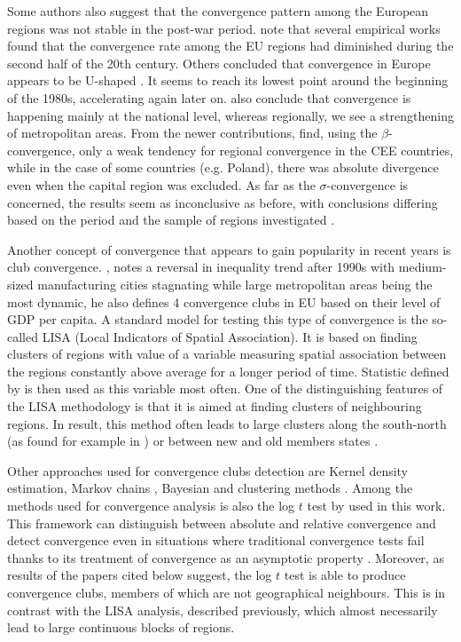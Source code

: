 \documentclass[11pt]{article}
\begin{document}
 Some authors also suggest that the convergence pattern among the European regions was not stable in the post-war period. \citet{eckey2007convergence} note that several empirical works found that the convergence rate among the EU regions had diminished during the second half of the 20th century. Others concluded that convergence in Europe appears to be U-shaped \citep{basile2001regional, geppert2008regional}. It seems to reach its lowest point around the beginning of the 1980s, accelerating again later on. \citet{geppert2008regional} also conclude that convergence is happening mainly at the national level, whereas regionally, we see a strengthening of metropolitan areas. From the newer contributions, \citet*{sme2012regional} find, using the $\beta$-convergence, only a weak tendency for regional convergence in the CEE countries, while in the case of some countries (e.g. Poland), there was absolute divergence even when the capital region was excluded. As far as the $\sigma$-convergence is concerned, the results seem as inconclusive as before, with conclusions differing based on the period and the sample of regions investigated \citep{eckey2007convergence}.
 
 Another concept of convergence that appears to gain popularity in recent years is club convergence. \citet{iammarino2017regional}, notes a reversal in inequality trend after 1990s with medium-sized manufacturing cities stagnating while large metropolitan areas being the most dynamic, he also defines 4 convergence clubs in EU based on their level of GDP per capita.  %
 A standard model for testing this type of convergence is the so-called LISA (Local Indicators of Spatial Association). It is based on finding clusters of regions with value of a variable measuring spatial association between the regions constantly above  average for a longer period of time. Statistic defined by \citet{getis1992analysis} is then used as this variable most often. One of the distinguishing features of the LISA methodology is that it is aimed at finding clusters of neighbouring regions. In result, this method often leads to large clusters along the south-north  (as found for example in \citet{baumont2003spatial}) or between new and old members states \citep{eckey2007convergence}.
 
Other approaches used for convergence clubs detection are Kernel density estimation, Markov chains \citep{eckey2007convergence}, Bayesian \citep{fischer2015bayesian} and clustering methods \citep{maasoumi2008economic}. 
Among the methods used for convergence analysis is also the log $t$ test by \citet{phillips2007transition} used in this work. This framework can distinguish between absolute and relative convergence and detect convergence even in situations where traditional convergence tests fail thanks to its treatment of convergence as an asymptotic property \citep{bartkowska2012regional, borsi2015evolution}.
Moreover, as results of the papers cited below suggest, the log $t$ test is able to produce convergence clubs, members of which are not geographical neighbours. This is in contrast with the LISA analysis, described previously, which almost necessarily lead to large continuous blocks of regions.
\end{document}
